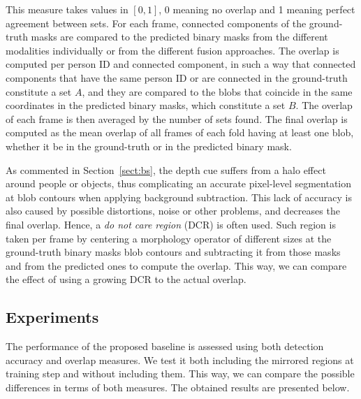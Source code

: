 \documentclass[10pt,twocolumn,letterpaper]{article}
\begin{document}
This measure takes values in $[0,1]$, 0 meaning no overlap and 1 meaning perfect agreement between sets. For each frame, connected components of the ground-truth masks are compared to the predicted binary masks from the different modalities individually or from the different fusion approaches. The overlap is computed per person ID and connected component, in such a way that connected components that have the same person ID or are connected in the ground-truth constitute a set $A$, and they are compared to the blobs that coincide in the same coordinates in the predicted binary masks, which constitute a set $B$. The overlap of each frame is then averaged by the number of sets found. The final overlap is computed as the mean overlap of all frames of each fold having at least one blob, whether it be in the ground-truth or in the predicted binary mask.

As commented in Section~\ref{sect:bs}, the depth cue suffers from a halo effect around people or objects, thus complicating an accurate pixel-level segmentation at blob contours when applying background subtraction. This lack of accuracy is also caused by possible distortions, noise or other problems, and decreases the final overlap. Hence, a \emph{do not care region} (DCR) is often used. Such region is taken per frame by centering a morphology operator of different sizes at the ground-truth binary masks blob contours and subtracting it from those masks and from the predicted ones to compute the overlap. This way, we can compare the effect of using a growing DCR to the actual overlap.


\subsection{Experiments}

The performance of the proposed baseline is assessed using both detection accuracy and overlap measures. We test it both including the mirrored regions at training step and without including them. This way, we can compare the possible differences in terms of both measures. The obtained results are presented below.
\end{document}
